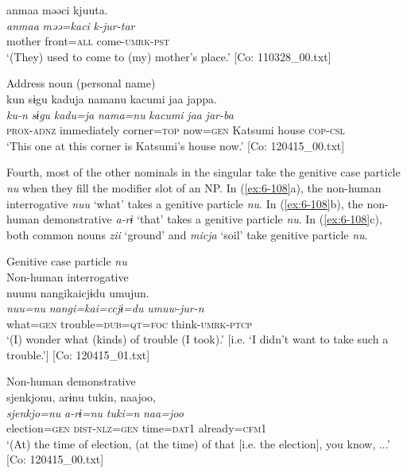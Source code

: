 {\TM}
\glll anmaa  məəci  kjuuta.\\
    \textit{anmaa}  \textit{məə=kaci}  \textit{k-jur-tar}\\
      mother  front=\textsc{all}  come-\textsc{umrk}-\textsc{pst}\\
\glt ‘(They) used to come to (my) mother’s place.’ [Co: 110328\_00.txt]
\z

\ex Address noun (personal name)\\
{\TM}
\glll  kun  sɨgu  kaduja  namanu    kacumi  jaa  jappa.\\
\textit{ku-n}  \textit{sɨgu}  \textit{kadu=ja}  \textit{nama=nu}   \textit{kacumi}  \textit{jaa}  \textit{jar-ba}\\
\textsc{prox}-\textsc{adnz}  immediately  corner=\textsc{top}  now=\textsc{gen}  Katsumi  house  \textsc{cop}-\textsc{csl}\\
\glt ‘This one at this corner is Katsumi’s house now.’ [Co: 120415\_00.txt]
\z

  Fourth, most of the other nominals in the singular take the genitive case particle \textit{nu} when they fill the modifier slot of an NP. In (\ref{ex:6-108}a), the non-human interrogative \textit{nuu} ‘what’ takes a genitive particle \textit{nu}. In (\ref{ex:6-108}b), the non-human demonstrative \textit{a-rɨ} ‘that’ takes a genitive particle \textit{nu}. In (\ref{ex:6-108}c), both common nouns \textit{zii} ‘ground’ and \textit{micja} ‘soil’ take genitive particle \textit{nu}.

\ea\label{ex:6-108}
  Genitive case particle \textit{nu}\\
 \ea Non-human interrogative\\
{\TM}
\glll  nuunu  nangikaicjɨdu  umujun.\\
\textit{nuu=nu}  \textit{nangi=kai=ccjɨ=du}  \textit{umuw-jur-n}\\
what=\textsc{gen}  trouble=\textsc{dub}=\textsc{qt}=\textsc{foc}  think-\textsc{umrk}-\textsc{ptcp}\\
\glt ‘(I) wonder what (kinds) of trouble (I took).’ [i.e. ‘I didn’t want to take such a trouble.’]      [Co: 120415\_01.txt]
\z

\ex Non-human demonstrative\\
{\TM}
\glll  {\textbar}sjenkjo{\textbar}nu,  arɨnu  tukin,  naajoo,\\
\textit{sjenkjo=nu}  \textit{a-rɨ=nu}  \textit{tuki=n}  \textit{naa=joo}\\
election=\textsc{gen}  \textsc{dist}-\textsc{nlz}=\textsc{gen}  time=\textsc{dat}1  already=\textsc{cfm}1\\
\glt ‘(At) the time of election, (at the time) of that [i.e. the election], you know, ...’ [Co: 120415\_00.txt]
\z

